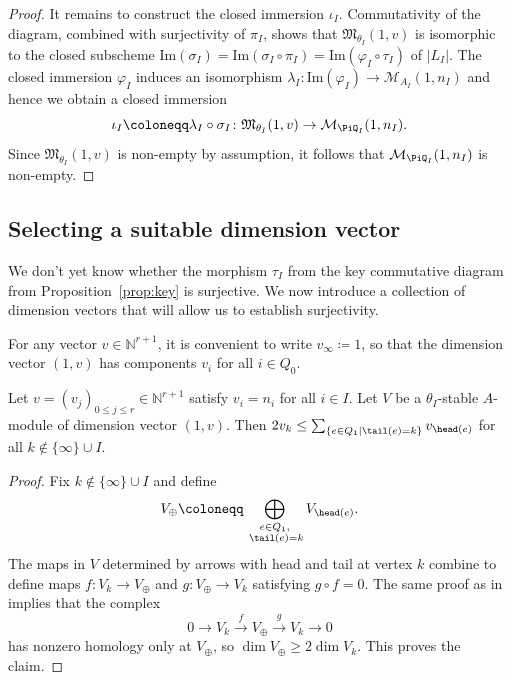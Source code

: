 \begin{proof}
 It remains to construct the closed immersion $\iota_I$. Commutativity of the diagram, combined with surjectivity of $\pi_I$, shows that $\mathfrak{M}_{\theta_I}(1,v)$ is isomorphic to the closed subscheme $\mathrm{Im}(\sigma_I)= \mathrm{Im}(\sigma_I\circ \pi_I) = \mathrm{Im}(\varphi_{I}\circ \tau_I)$ of $\vert L_I\vert$. The closed immersion $\varphi_I$ induces an isomorphism $\lambda_I\colon \mathrm{Im}(\varphi_I) \to \mathcal{M}_{A_I}(1,n_I)$ and hence we obtain a closed immersion
 \[
 \iota_I\coloneqq \lambda_I\circ \sigma_I\colon \mathfrak{M}_{\theta_I}(1,v)\to \mathcal{M}_{\PiQ_I}(1,n_I).
 \]
 Since $\mathfrak{M}_{\theta_I}(1,v)$ is non-empty by assumption, it follows that $\mathcal{M}_{\PiQ_I}(1,n_I)$ is non-empty.
 \end{proof}

\subsection{Selecting a suitable dimension vector}
We don't yet know whether the morphism $\tau_I$ from the key commutative diagram from Proposition~\ref{prop:key} is surjective. We now introduce a collection of dimension vectors that will allow us to establish surjectivity.

For any vector $v\in \mathbb{N}^{r+1}$, it is convenient to write $v_\infty \coloneqq 1$, so that the dimension vector $(1,v)$ has components $v_i$ for all $i\in Q_0$.

 \begin{Lemma}
 \label{lem:Vnj}
 Let $v=(v_j)_{0 \leq j \leq r} \in \mathbb{N}^{r+1}$ satisfy $v_i=n_i$ for all $i \in I$. Let $ V $ be a $ \theta_I $-stable $A$-module
 of dimension vector $(1,v)$. Then $2v_k \leq \sum_{\{e \in Q_1\mid \tail(e)=k\}} v_{\head(e)}$ for all $k \notin \{\infty\}\cup I$.
 \end{Lemma}
 \begin{proof}
 Fix $k \notin \{\infty\}\cup I$ and define
 \[
 	V_\oplus\coloneqq\bigoplus_{\substack{e\in {Q_1},\\ \; \tail(e)=k }} V_{\head(e)}.
 	\]
 	The maps in $V$ determined by arrows with head and tail at vertex $k$ combine to define maps $f\colon V_k\to V_\oplus$ and $g\colon V_\oplus\to V_k$ satisfying $g\circ f = 0$.
 	The same proof as in \cite[Proposition A.2]{craw2019punctual} implies that the complex
 	\[
 	0 \longrightarrow V_k\stackrel{f}{\longrightarrow} V_\oplus \stackrel{g}{\longrightarrow} V_k \longrightarrow 0
 	\]
 	has nonzero homology only at $V_\oplus$, so $\dim V_\oplus \geq 2\dim V_k$. This proves the claim.
 \end{proof}


